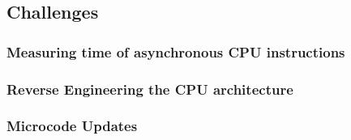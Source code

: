 \subsection{Challenges}
\label{subsec:interconnect-sc-store-ops-challenges}

\subsubsection{Measuring time of asynchronous CPU instructions}
\label{subsubsec:interconnect-sc-store-ops-challenges-measuring-time}

\subsubsection{Reverse Engineering the CPU architecture}
\label{subsubsec:interconnect-sc-store-ops-challenges-reverse-engineering}

\subsubsection{Microcode Updates}
\label{subsubsec:interconnect-sc-store-ops-challenges-microcode-updates}